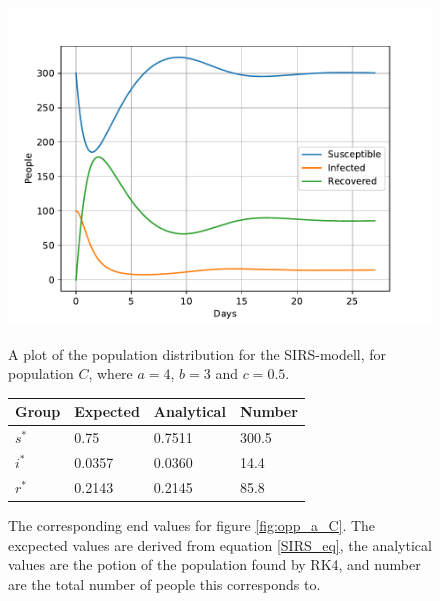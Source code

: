\documentclass[a4paper]{article}
\begin{document}
\begin{figure}
	\centering
	\begin{minipage}{0.49\textwidth}
		\centering
		\includegraphics[scale=0.6]{../plots/opp_a_C.pdf}
		\caption{A plot of the population distribution for the SIRS-modell, for population $C$, where $a=4$, $b=3$ and $c=0.5$. }\label{fig:opp_a_C}
	\end{minipage}
	\begin{minipage}{0.49\textwidth}
		\centering
		\captionsetup{type=table} %
		\begin{tabular}{|l|l|l|l|}
			\hline
			Group & Expected & Analytical   & Number  \\ \hline
			$s^*$ & 0.75 & 0.7511 & 300.5 \\ \hline
			$i^*$ & 0.0357 & 0.0360 & 14.4 \\ \hline
			$r^*$ & 0.2143 & 0.2145 & 85.8 \\ \hline
		\end{tabular}
		\caption{The corresponding end values for figure \ref{fig:opp_a_C}. The excpected values are derived from equation \ref{SIRS_eq}, the analytical values are the potion of the population found by RK4, and number are the total number  of people this corresponds to.}\label{tab:opp_a_C}
	\end{minipage}
\end{figure}
\end{document}

